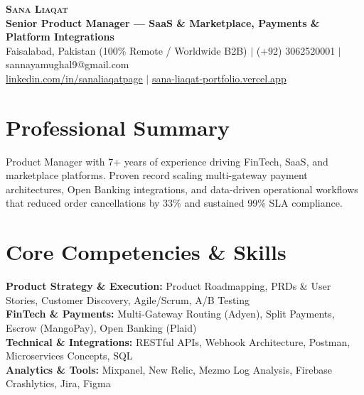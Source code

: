 \documentclass[letterpaper,10pt]{article}
\begin{document}
\begin{center}
    \textbf{\Huge \scshape Sana Liaqat} \\ \vspace{2pt}
    \textbf{\large Senior Product Manager — SaaS \& Marketplace, Payments \& Platform Integrations} \\ \vspace{3pt}
    \small Faisalabad, Pakistan (100\% Remote / Worldwide B2B) $|$ (+92) 3062520001 $|$ sannayamughal9@gmail.com \\ \vspace{1pt} 
    \small \href{https://www.linkedin.com/in/sanaliaqatpage/}{\underline{linkedin.com/in/sanaliaqatpage}} $|$ \href{https://sana-liaqat-portfolio.vercel.app/}{\underline{sana-liaqat-portfolio.vercel.app}}
\end{center}

\section{Professional Summary}
\small{
Product Manager with 7+ years of experience driving FinTech, SaaS, and marketplace platforms. Proven record scaling multi-gateway payment architectures, Open Banking integrations, and data-driven operational workflows that reduced order cancellations by 33\% and sustained 99\% SLA compliance.
}

\section{Core Competencies \& Skills}
\begin{itemize}[leftmargin=0.15in, label={}]
    \small{\item{
     \textbf{Product Strategy \& Execution:} Product Roadmapping, PRDs \& User Stories, Customer Discovery, Agile/Scrum, A/B Testing \\
     \textbf{FinTech \& Payments:} Multi-Gateway Routing (Adyen), Split Payments, Escrow (MangoPay), Open Banking (Plaid) \\
     \textbf{Technical \& Integrations:} RESTful APIs, Webhook Architecture, Postman, Microservices Concepts, SQL \\
     \textbf{Analytics \& Tools:} Mixpanel, New Relic, Mezmo Log Analysis, Firebase Crashlytics, Jira, Figma
    }}
\end{itemize}

\end{document}
